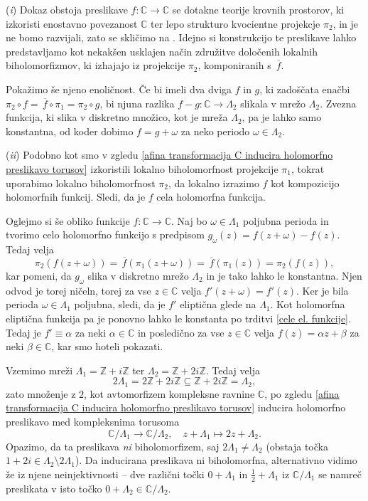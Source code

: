 \documentclass[mat1]{fmfdelo}
\numberwithin{equation}{section}
\newcommand{\Z}{\mathbb Z}
\newcommand{\C}{\mathbb C}
\newcommand{\om}{\omega}
\newcommand{\olsi}[1]{\,\overline{\!{#1}}} %
\theoremstyle{definition}
\begin{document}
\begin{dokaz}
    (\emph{i}) Dokaz obstoja preslikave $f : \C \to \C$ se dotakne teorije krovnih prostorov, ki izkoristi enostavno povezanost $\C$ ter lepo strukturo kvocientne projekcje $\pi_2$, in je ne bomo razvijali, zato se skličimo na \cite[lemma 3.1]{Stevenhagen}. Idejno si konstrukcijo te preslikave lahko predstavljamo kot nekakšen usklajen način združitve določenih lokalnih biholomorfizmov, ki izhajajo iz projekcije $\pi_2$, komponiranih s $\olsi{f}$.

    Pokažimo še njeno enoličnost. Če bi imeli dva dviga $f$ in $g$, ki zadoščata enačbi $\pi_2 \circ f = \olsi{f} \circ \pi_1 = \pi_2 \circ g$, bi njuna razlika $f - g : \C \to \Lambda_2$ slikala v mrežo $\Lambda_2$. Zvezna funkcija, ki slika v diskretno množico, kot je mreža $\Lambda_2$, pa je lahko samo konstantna, od koder dobimo $f = g + \om$ za neko periodo $\om \in \Lambda_2$.

    (\emph{ii}) Podobno kot smo v zgledu \ref{afina transformacija C inducira holomorfno preslikavo torusov} izkoristili lokalno biholomorfnost projekcije $\pi_1$, tokrat uporabimo lokalno biholomorfnost $\pi_2$, da lokalno izrazimo $f$ kot kompozicijo holomorfnih funkcij. Sledi, da je $f$ cela holomorfna funkcija. 

    Oglejmo si še obliko funkcije $f : \C \to \C$. Naj bo $\om \in \Lambda_1$ poljubna perioda in tvorimo celo holomorfno funkcijo s predpisom $g_\om(z) = f(z + \om) - f(z)$. Tedaj velja
    \[
        \pi_2(f(z + \om)) = \olsi{f}(\pi_1(z + \om)) = 
        \olsi{f}(\pi_1(z)) = \pi_2(f(z)),
    \] 
    kar pomeni, da $g_\om$ slika v diskretno mrežo $\Lambda_2$ in je tako lahko le konstantna. Njen odvod je torej ničeln, torej za vse $z \in \C$ velja $f'(z + \om) = f'(z)$. Ker je bila perioda $\om \in \Lambda_1$ poljubna, sledi, da je $f'$ eliptična glede na $\Lambda_1$. Kot holomorfna eliptična funkcija pa je ponovno lahko le konstanta po trditvi \ref{cele el. funkcije}. Tedaj je $f' \equiv \alpha$ za neki $\alpha \in \C$ in posledično za vse $z \in \C$ velja $f(z) = \alpha z + \beta$ za neki $\beta \in \C$, kar smo hoteli pokazati. 
\end{dokaz}

\begin{primer*}
    Vzemimo mreži $\Lambda_1 = \Z + i\Z$ ter $\Lambda_2 = \Z + 2i\Z$. Tedaj velja 
    \[
        2\Lambda_1 = 2\Z + 2i\Z \subseteq \Z + 2i\Z = \Lambda_2, 
    \]
    zato množenje z $2$, kot avtomorfizem kompleksne ravnine $\C$, po zgledu \ref{afina transformacija C inducira holomorfno preslikavo torusov} inducira holomorfno preslikavo med kompleksnima torusoma
    \[
        \C/\Lambda_1 \to \C/\Lambda_2, \quad z + \Lambda_1 \mapsto 2z + \Lambda_2.
    \]
    Opazimo, da ta preslikava \emph{ni} biholomorfizem, saj $2\Lambda_1 \neq \Lambda_2$ (obstaja točka $1 + 2i \in \Lambda_2 \setminus 2\Lambda_1$). Da inducirana preslikava ni biholomorfna, alternativno vidimo že iz njene neinjektivnosti -- dve različni točki $0 + \Lambda_1$ in $\frac12 + \Lambda_1$ iz $\C/\Lambda_1$ se namreč preslikata v isto točko $0 + \Lambda_2 \in \C/\Lambda_2$.  
    
\end{primer*}
\end{document}
